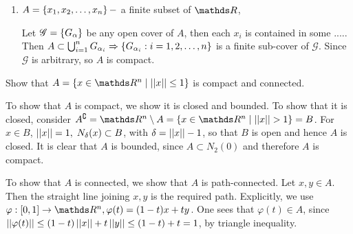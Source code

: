 \documentclass[../main-sheet.tex]{subfiles}
\begin{document}
\begin{soln}
    \hfill
    \begin{enumerate}[label=(\roman*)]
        \item $ A=\left\{x_1,x_2,\dots,x_n\right\} -$ a finite subset of $ \R $,
        
        Let $ \mathscr{G}=\left\{G_\alpha\right\} $ be any open cover of $ A $, then each $ x_i $ is contained in some ..... Then $ A\subset \bigcup_{i=1}^n G_{\alpha_i}\Rightarrow \left\{G_{\alpha_i}:i=1,2,\dots,n\right\} $ is a finite sub-cover of $ \mathscr{G} $. Since $ \mathscr{G} $ is arbitrary, so $ A $ is compact.
    \end{enumerate}
\end{soln}
\begin{prob}
    Show that $ A=\set{x\in \R^n\mid \norm{x}\leq 1} $ is compact and connected.
\end{prob}
\begin{soln}
    To show that $ A $ is compact, we show it is closed and bounded. To show that it is closed, consider $ A^\complement=\R^n\setminus A=\set{x\in \R^n\mid \norm{x}>1}=B $. For $ x\in B $, $ \left\vert\left\vert x\right\vert\right\vert=1,\; N_\delta (x)\subset B $, with $ \delta=\left\vert\left\vert x\right\vert\right\vert-1 $, so that $ B $ is open and hence $ A $ is closed. It is clear that $ A $ is bounded, since $ A\subset N_2(0) $ and therefore $ A $ is compact.

    To show that $ A $ is connected, we show that $ A $ is path-connected. Let $ x,y\in A $. Then the straight line joining $ x,y $ is the required path. Explicitly, we use $ \varphi:[0,1]\to\R^n,\varphi(t)=(1-t)x+ty $. One sees that $ \varphi(t)\in A $, since $ \left\vert\left\vert\varphi(t)\right\vert\right\vert\leq (1-t)\left\vert\left\vert x\right\vert\right\vert+t\left\vert\left\vert y\right\vert\right\vert\leq (1-t)+t=1 $, by triangle inequality.
\end{soln}
\end{document}
